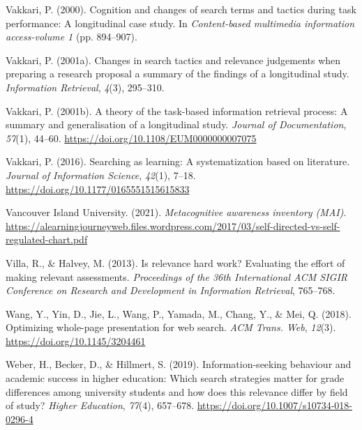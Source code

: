 \documentclass[letterpaper, nobind]{templates/ociamthesis}
\newlength{\cslhangindent}
\newenvironment{CSLReferences}[2] %
 {%
  \setlength{\parindent}{0pt}
  \ifodd #1
  \let\oldpar\par
  \def\par{\hangindent=\cslhangindent\oldpar}
  \fi
  \setlength{\parskip}{1mm}
  \setlength{\baselineskip}{6mm}
 }%
 {}
\begin{document}
\begin{CSLReferences}{1}{0}
\leavevmode{}%
Vakkari, P. (2000). Cognition and changes of search terms and tactics during task performance: A longitudinal case study. In \emph{Content-based multimedia information access-volume 1} (pp. 894--907).

\leavevmode{}%
Vakkari, P. (2001a). Changes in search tactics and relevance judgements when preparing a research proposal a summary of the findings of a longitudinal study. \emph{Information Retrieval}, \emph{4}(3), 295--310.

\leavevmode{}%
Vakkari, P. (2001b). A theory of the task-based information retrieval process: A summary and generalisation of a longitudinal study. \emph{Journal of Documentation}, \emph{57}(1), 44--60. \url{https://doi.org/10.1108/EUM0000000007075}

\leavevmode{}%
Vakkari, P. (2016). Searching as learning: A systematization based on literature. \emph{Journal of Information Science}, \emph{42}(1), 7--18. \url{https://doi.org/10.1177/0165551515615833}

\leavevmode{}%
Vancouver Island University. (2021). \emph{Metacognitive awareness inventory (MAI)}. \url{https://alearningjourneyweb.files.wordpress.com/2017/03/self-directed-vs-self-regulated-chart.pdf}

\leavevmode{}%
Villa, R., \& Halvey, M. (2013). Is relevance hard work? Evaluating the effort of making relevant assessments. \emph{Proceedings of the 36th International ACM SIGIR Conference on Research and Development in Information Retrieval}, 765--768.

\leavevmode{}%
Wang, Y., Yin, D., Jie, L., Wang, P., Yamada, M., Chang, Y., \& Mei, Q. (2018). Optimizing whole-page presentation for web search. \emph{ACM Trans. Web}, \emph{12}(3). \url{https://doi.org/10.1145/3204461}

\leavevmode{}%
Weber, H., Becker, D., \& Hillmert, S. (2019). Information-seeking behaviour and academic success in higher education: Which search strategies matter for grade differences among university students and how does this relevance differ by field of study? \emph{Higher Education}, \emph{77}(4), 657--678. \url{https://doi.org/10.1007/s10734-018-0296-4}


\end{CSLReferences}
\end{document}
